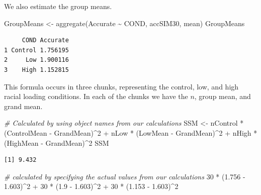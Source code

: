 \documentclass[
  11pt,
]{book}
\newenvironment{Shaded}{\begin{snugshade}}{\end{snugshade}}
\newcommand{\CommentTok}[1]{\textcolor[rgb]{0.56,0.35,0.01}{\textit{#1}}}
\newcommand{\DecValTok}[1]{\textcolor[rgb]{0.00,0.00,0.81}{#1}}
\newcommand{\FloatTok}[1]{\textcolor[rgb]{0.00,0.00,0.81}{#1}}
\newcommand{\FunctionTok}[1]{\textcolor[rgb]{0.00,0.00,0.00}{#1}}
\newcommand{\NormalTok}[1]{#1}
\newcommand{\OtherTok}[1]{\textcolor[rgb]{0.56,0.35,0.01}{#1}}
\newcommand{\SpecialCharTok}[1]{\textcolor[rgb]{0.00,0.00,0.00}{#1}}
\begin{document}
We also estimate the group means.

\begin{Shaded}
\begin{Highlighting}[]
\NormalTok{GroupMeans }\OtherTok{\textless{}{-}} \FunctionTok{aggregate}\NormalTok{(Accurate }\SpecialCharTok{\textasciitilde{}}\NormalTok{ COND, accSIM30, mean)}
\NormalTok{GroupMeans}
\end{Highlighting}
\end{Shaded}

\begin{verbatim}
     COND Accurate
1 Control 1.756195
2     Low 1.900116
3    High 1.152815
\end{verbatim}

This formula occurs in three chunks, representing the control, low, and high racial loading conditions. In each of the chunks we have the \(n\), group mean, and grand mean.

\begin{Shaded}
\begin{Highlighting}[]
\CommentTok{\# Calculated by using object names from our calculations}
\NormalTok{SSM }\OtherTok{\textless{}{-}}\NormalTok{ nControl }\SpecialCharTok{*}\NormalTok{ (ControlMean }\SpecialCharTok{{-}}\NormalTok{ GrandMean)}\SpecialCharTok{\^{}}\DecValTok{2} \SpecialCharTok{+}\NormalTok{ nLow }\SpecialCharTok{*}\NormalTok{ (LowMean }\SpecialCharTok{{-}}\NormalTok{ GrandMean)}\SpecialCharTok{\^{}}\DecValTok{2} \SpecialCharTok{+}
\NormalTok{    nHigh }\SpecialCharTok{*}\NormalTok{ (HighMean }\SpecialCharTok{{-}}\NormalTok{ GrandMean)}\SpecialCharTok{\^{}}\DecValTok{2}
\NormalTok{SSM}
\end{Highlighting}
\end{Shaded}

\begin{verbatim}
[1] 9.432
\end{verbatim}

\begin{Shaded}
\begin{Highlighting}[]
\CommentTok{\# calculated by specifying the actual values from our calculations}
\DecValTok{30} \SpecialCharTok{*}\NormalTok{ (}\FloatTok{1.756} \SpecialCharTok{{-}} \FloatTok{1.603}\NormalTok{)}\SpecialCharTok{\^{}}\DecValTok{2} \SpecialCharTok{+} \DecValTok{30} \SpecialCharTok{*}\NormalTok{ (}\FloatTok{1.9} \SpecialCharTok{{-}} \FloatTok{1.603}\NormalTok{)}\SpecialCharTok{\^{}}\DecValTok{2} \SpecialCharTok{+} \DecValTok{30} \SpecialCharTok{*}\NormalTok{ (}\FloatTok{1.153} \SpecialCharTok{{-}} \FloatTok{1.603}\NormalTok{)}\SpecialCharTok{\^{}}\DecValTok{2}
\end{Highlighting}
\end{Shaded}
\end{document}
